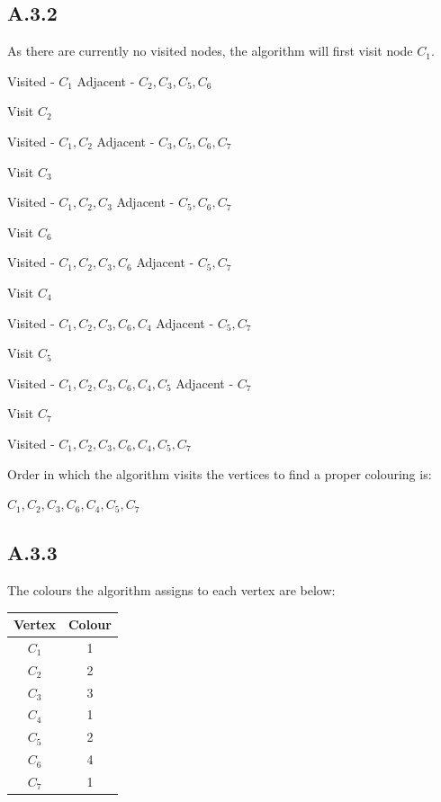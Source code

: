 \documentclass{article}
\begin{document}
\subsection*{A.3.2}
As there are currently no visited nodes, the algorithm will first visit node $C_1$.
\begin{center}
Visited - $C_1$
\newline
Adjacent - $C_2,C_3,C_5,C_6$
\newline
\end{center}
Visit $C_2$
\begin{center}
Visited - $C_1,C_2$
\newline
Adjacent - $C_3,C_5,C_6,C_7$
\newline
\end{center}
Visit $C_3$
\begin{center}
Visited - $C_1,C_2,C_3$
\newline
Adjacent - $C_5,C_6,C_7$
\newline
\end{center}
Visit $C_6$
\begin{center}
Visited - $C_1,C_2,C_3,C_6$
\newline
Adjacent - $C_5,C_7$
\end{center}
Visit $C_4$
\begin{center}
Visited - $C_1,C_2,C_3,C_6,C_4$
\newline
Adjacent - $C_5,C_7$
\end{center}
Visit $C_5$
\begin{center}
Visited - $C_1,C_2,C_3,C_6,C_4,C_5$
\newline
Adjacent - $C_7$
\newline
\end{center}
Visit $C_7$
\begin{center}
Visited - $C_1,C_2,C_3,C_6,C_4,C_5,C_7$
\newline
\end{center}
Order in which the algorithm visits the vertices to find a proper colouring is:
\newline
\begin{center}
$C_1,C_2,C_3,C_6,C_4,C_5,C_7$
\end{center}
\subsection*{A.3.3}
The colours the algorithm assigns to each vertex are below:
\begin{center}
\begin{tabular}{ |c|c| }
\hline
Vertex & Colour \\
\hline
$C_1$  & 1      \\
$C_2$  & 2      \\
$C_3$  & 3      \\
$C_4$  & 1      \\
$C_5$  & 2      \\
$C_6$  & 4      \\
$C_7$  & 1       \\
\hline
\end{tabular}
\end{center}
\end{document}
